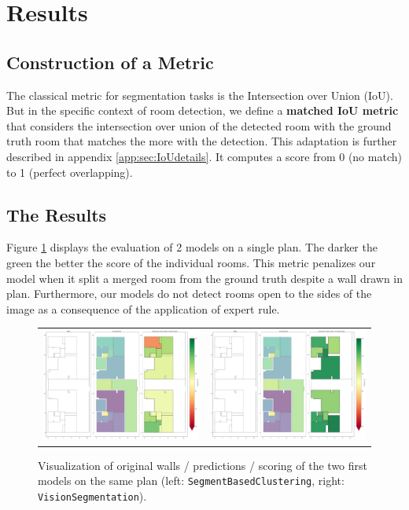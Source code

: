 \documentclass[11pt]{article}
\begin{document}
\section{Results}

\subsection{Construction of a Metric}
\label{sec:metric}
The classical metric for segmentation tasks is the Intersection over Union (IoU).
But in the specific context of room detection, we define a \textbf{matched IoU
metric} that considers the intersection over union of the detected room with the
ground truth room that matches the more with the detection.
This adaptation is further described in appendix 
\ref{app:sec:IoUdetails}. It computes a score from 0 (no match) to 1 (perfect 
overlapping). 
\subsection{The Results}
Figure \ref{fig:result_segmentation} displays the evaluation of 2 models on a single 
plan. The darker the green the better the score of the individual rooms. This metric 
penalizes our model when it split a merged room from the ground truth despite a 
wall drawn in plan. Furthermore, our models do not detect rooms open to the sides
of the image as a consequence of the application of expert rule.
\begin{figure}[h]
    \centering
    \begin{tabular}{cc}
        \includegraphics[width=0.45\linewidth]{figures/ScoreSeg.png} &
        \includegraphics[width=0.45\linewidth]{figures/ScoreCV.png} \\
        
    \end{tabular}
    \caption{Visualization of original walls / predictions / scoring of the two first models 
    on the same plan
    (left: \texttt{SegmentBasedClustering}, right: \texttt{VisionSegmentation}).}
    \label{fig:result_segmentation}
\end{figure}
\end{document}
